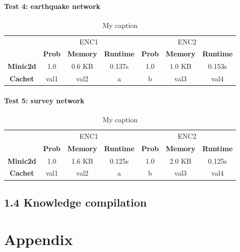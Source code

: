\documentclass[a4paper,10pt]{report}
\begin{document}
\subsubsection{Test 4: earthquake network}
\begin{table}[H]
\centering
\caption{My caption}
\label{my-label}
\begin{tabular}{c|c|c|c|c|c|c|}
\cline{2-7}
        & \multicolumn{3}{c|}{ENC1} & \multicolumn{3}{c|}{ENC2} \\ \cline{2-7} 
  & \textbf{Prob}  & \textbf{Memory}  & \textbf{Runtime} & \textbf{Prob}  & \textbf{Memory}  & \textbf{Runtime} \\ \cline{1-7} 
  \textbf{Minic2d} & 1.0  & 0.6 KB & 0.137s   & 1.0    & 1.0 KB  & 	0.153s \\
  \hline
\textbf{Cachet}  & val1  & val2    & a       & b     & val3    & val4    \\ \cline{1-7} 
\end{tabular}
\end{table}

\subsubsection{Test 5: survey network}
\begin{table}[H]
\centering
\caption{My caption}
\label{my-label}
\begin{tabular}{c|c|c|c|c|c|c|}
\cline{2-7}
        & \multicolumn{3}{c|}{ENC1} & \multicolumn{3}{c|}{ENC2} \\ \cline{2-7} 
  & \textbf{Prob}  & \textbf{Memory}  & \textbf{Runtime} & \textbf{Prob}  & \textbf{Memory}  & \textbf{Runtime} \\ \cline{1-7} 
  \textbf{Minic2d} & 1.0  & 1.6 KB    & 0.125s   & 1.0    & 2.0 KB    & 	0.125s \\
  \hline
\textbf{Cachet}  & val1  & val2    & a       & b     & val3    & val4    \\ \cline{1-7} 
\end{tabular}
\end{table}

\section*{1.4 Knowledge compilation}

\chapter{Appendix}
\end{document}

